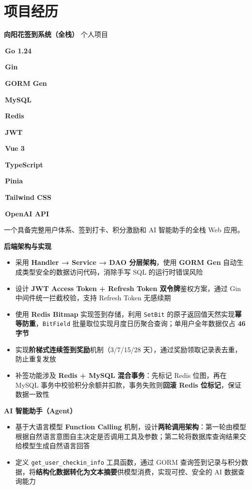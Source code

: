 \documentclass[a4paper,11pt]{article}
\newcommand{\techtag}[1]{%
  \colorbox{tagbg}{\small\color{tagtext}\sffamily\bfseries\,#1\,}%
}
\newcommand{\projectheader}[2]{%
  \vspace{0.3em}
  {\large\bfseries\sffamily #1} \hfill {\color{lightgray}\sffamily #2}
  \vspace{0.2em}
}
\newcommand{\moduleheader}[1]{%
  \vspace{0.4em}
  {\bfseries\sffamily\color{accent} #1}
  \vspace{0.1em}
}
\newcommand{\keyword}[1]{\textbf{#1}}
\begin{document}
\section*{项目经历}

\projectheader{向阳花签到系统（全栈）}{个人项目}

\vspace{0.2em}

\techtag{Go 1.24}
\techtag{Gin}
\techtag{GORM Gen}
\techtag{MySQL}
\techtag{Redis}
\techtag{JWT}
\techtag{Vue 3}
\techtag{TypeScript}
\techtag{Pinia}
\techtag{Tailwind CSS}
\techtag{OpenAI API}

\vspace{0.4em}

一个具备完整用户体系、签到打卡、积分激励和 AI 智能助手的全栈 Web 应用。

\moduleheader{后端架构与实现}

\begin{itemize}[leftmargin=1.5em, itemsep=2pt, parsep=0pt]
  \item 采用 \keyword{Handler → Service → DAO 分层架构}，使用 \keyword{GORM Gen} 自动生成类型安全的数据访问代码，消除手写 SQL 的运行时错误风险

  \item 设计 \keyword{JWT Access Token + Refresh Token 双令牌}鉴权方案，通过 Gin 中间件统一拦截校验，支持 Refresh Token 无感续期

  \item 使用 \keyword{Redis Bitmap} 实现签到存储，利用 \texttt{SetBit} 的原子返回值天然实现\keyword{幂等防重}，\texttt{BitField} 批量取位实现月度日历聚合查询；单用户全年数据仅占 \keyword{46 字节}

  \item 实现\keyword{阶梯式连续签到奖励}机制（3/7/15/28 天），通过奖励领取记录表去重，防止重复发放

  \item 补签功能涉及 \keyword{Redis + MySQL 混合事务}：先标记 Redis 位图，再在 MySQL 事务中校验积分余额并扣款，事务失败则\keyword{回滚 Redis 位标记}，保证数据一致性
\end{itemize}

\moduleheader{AI 智能助手（Agent）}

\begin{itemize}[leftmargin=1.5em, itemsep=2pt, parsep=0pt]
  \item 基于大语言模型 \keyword{Function Calling} 机制，设计\keyword{两轮调用架构}：第一轮由模型根据自然语言意图自主决定是否调用工具及参数；第二轮将数据库查询结果交给模型生成自然语言回答

  \item 定义 \texttt{get\_user\_checkin\_info} 工具函数，通过 GORM 查询签到记录与积分数据，将\keyword{结构化数据转化为文本摘要}供模型消费，实现可控、安全的 AI 数据查询能力
\end{itemize}
\end{document}
